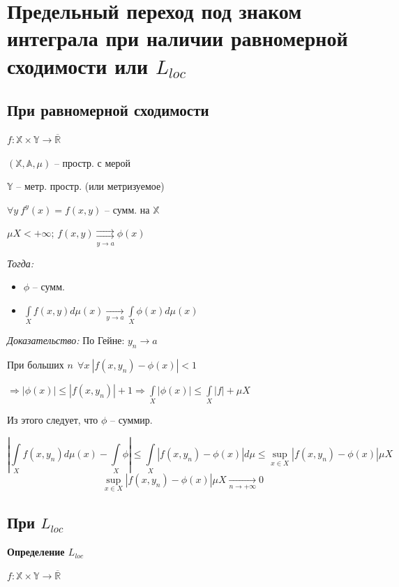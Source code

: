 \documentclass[paper=a4, fontsize=17pt]{article}
\begin{document}
\section{Предельный переход под знаком интеграла при наличии равномерной сходимости или $L_{loc}$}

\subsection{При равномерной сходимости}
$ f : \mathbb{X} \times \mathbb{Y} \rightarrow \overline{\mathbb{R}}$

$ (\mathbb{X}, \mathbb{A}, \mu) $ -- простр. с мерой

$ \mathbb{Y} $ -- метр. простр. (или метризуемое)

$ \forall y ~ f^y(x) = f(x, y) $ -- сумм. на $ \mathbb{X} $

\bigskip

$ \mu X < +\infty $; $ f(x,y) \underset{y \rightarrow a}{\rightrightarrows} \phi(x) $

\emph{Тогда:}

\begin{itemize}
	\item $ \phi $ -- сумм.
	\item $ \int\limits_{X} f(x, y) d\mu (x) \underset{y \rightarrow a}{\longrightarrow} \int\limits_{X} \phi(x) d\mu(x) $
\end{itemize}

\emph{Доказательство:} По Гейне: $ y_n \rightarrow a $

При больших $ n ~ ~ \forall x ~ |f(x, y_n) - \phi(x) | < 1$

$ \Rightarrow | \phi(x) | \leq | f(x, y_n) | + 1
  \Rightarrow \int\limits_X | \phi(x) | \leq \int\limits_X|f| + \mu X$

Из этого следует, что $ \phi $ -- суммир.

$$ |\int\limits_X f(x, y_n) d\mu(x) - \int\limits_X \phi |
\leq \int\limits_X | f(x, y_n) - \phi(x) | d\mu
\leq \sup\limits_{x \in X} | f(x, y_n) - \phi(x)| \mu X $$
$$\sup\limits_{x \in X} | f(x, y_n) - \phi(x)| \mu X \underset{n \rightarrow +\infty}{\longrightarrow} 0 $$

\subsection{При $L_{loc}$}

\textbf{Определение $ L_{loc} $}

$ f : \mathbb{X} \times \mathbb{Y} \rightarrow \overline{\mathbb{R}}$
\end{document}
